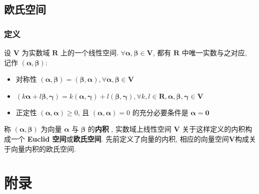 \documentclass{article}
\begin{document}
		\subsection{欧氏空间}
			\subsubsection{定义}
				设 $\boldsymbol V$ 为实数域 $\mathbf{R}$ 上的一个线性空间. $\forall\boldsymbol{\alpha}, \boldsymbol{\beta} \in \boldsymbol V$, 都有 $\mathbf{R}$ 中唯一实数与之对应, 记作 $(\boldsymbol{\alpha}, \boldsymbol{\beta})$:
				\begin{itemize}
				\item 对称性 $(\boldsymbol{\alpha}, \boldsymbol{\beta})=(\boldsymbol{\beta}, \boldsymbol{\alpha}), \forall \boldsymbol{\alpha}, \boldsymbol{\beta} \in \boldsymbol V$
				\item $(k \boldsymbol{\alpha}+l \boldsymbol{\beta}, \boldsymbol{\gamma})=k(\boldsymbol{\alpha}, \boldsymbol{\gamma})+l(\boldsymbol{\beta}, \boldsymbol{\gamma}), \forall k, l \in \mathbf{R}, \boldsymbol{\alpha}, \boldsymbol{\beta}, \boldsymbol{\gamma} \in \boldsymbol V$
				\item 正定性 $(\boldsymbol{\alpha}, \boldsymbol{\alpha}) \geqslant 0$, 且 $(\boldsymbol{\alpha}, \boldsymbol{\alpha})=0$ 的充分必要条件是 $\boldsymbol{\alpha}=\mathbf{0}$
				\end{itemize}
				称 $(\boldsymbol{\alpha}, \boldsymbol{\beta})$ 为向量 $\boldsymbol{\alpha}$ 与 $\boldsymbol{\beta}$ 的\textbf{内积} , 实数域上线性空间 $\boldsymbol V$ 关于这样定义的内积构成一个\textbf{ Euclid 空间}或\textbf{欧氏空间}. 先前定义了向量的内积, 相应的向量空间$\boldsymbol V$构成关于向量内积的欧氏空间.
	\section{附录}
\end{document}
